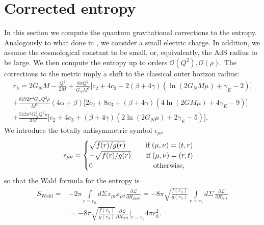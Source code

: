 \documentclass[10pt,a4paper]{article}
\begin{document}
\section{Corrected entropy}\label{sec:entropy}
In this section we compute the quantum gravitational corrections to the entropy. Analogously to what done in \cite{Delgado:2022pcc}, we consider a small electric charge. In addition, we assume the cosmological constant to be small, or, equivalently, the AdS radius to be large. We then compute the entropy up to orders $\mathcal{O}\left(Q^2\right),\mathcal{O}\left(\rho\right)$.
The corrections to the metric imply a shift to the classical outer horizon radius:
\begin{equation}\label{eq:new_radius}
\begin{gathered}
    r_h=2G_NM-\frac{Q^2}{2M}+\frac{8\pi Q^2}{G_NM^3}\Big[c_2+4c_3+2\left(\beta+4\gamma\right)\left(\ln\left(2G_N M\mu \right)+\gamma_E-2\right)\Big]\\
    +\frac{8192\pi^3G_NQ^2\rho}{M^3}(4\alpha+\beta)\Big[2c_2+8c_3+(\beta+4\gamma)\left(4\ln(2GM\mu)+4\gamma_E-9\right)\Big]\\
    +\frac{512\pi^2G^2_NQ^2\rho}{3M}\Big[c_2+4c_3+(\beta+4\gamma)\left(2\ln(2G_N\mu)+2\gamma_E-5\right)\Big].
\end{gathered}
\end{equation}
We introduce the totally antisymmetric symbol $\epsilon_{\mu\nu}$
\begin{equation}
\epsilon_{\mu\nu}=
\begin{cases}
\sqrt{f(r)/g(r)} \hspace{10mm} \text{if} \hspace{1 mm} (\mu,\nu)=(t,r) \\
-\sqrt{f(r)/g(r)} \hspace{7.5 mm} \text{if} \hspace{1 mm} (\mu,\nu)=(r,t)\\
0 \hspace{30 mm} \text{otherwise},
\end{cases}
\end{equation}
so that the Wald formula for the entropy is \cite{Wald:1993nt}
\begin{equation}\label{eq:wald}
\begin{split}
    S_{\text{Wald}}=&-2\pi \int\limits_{r=r_h} d\Sigma\, \epsilon_{\mu\nu}\epsilon_{\rho\sigma}\frac{\partial \mathcal{L}}{\partial R_{\mu\nu\rho\sigma}}= -8\pi\sqrt{\frac{f(r_h)}{g(r_h)}}\int\limits_{r=r_h}d\Sigma\, \frac{\partial \mathcal{L}}{\partial R_{rtrt}}\\
    &=-8\pi\sqrt{\frac{f(r_h)}{g(r_h)}}\frac{\partial \mathcal{L}}{\partial R_{rtrt}}\bigg\rvert_{r=r_h}4\pi r^2_h.
\end{split}
\end{equation}
\end{document}

